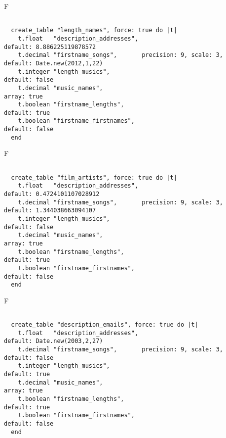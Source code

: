 F
\begin{verbatim}

  create_table "length_names", force: true do |t|
    t.float   "description_addresses",                         default: 8.886225119878572
    t.decimal "firstname_songs",       precision: 9, scale: 3, default: Date.new(2012,1,22)
    t.integer "length_musics",                                 default: false
    t.decimal "music_names",                                                                             array: true
    t.boolean "firstname_lengths",                             default: true
    t.boolean "firstname_firstnames",                          default: false
  end

\end{verbatim}

F
\begin{verbatim}

  create_table "film_artists", force: true do |t|
    t.float   "description_addresses",                         default: 0.4724101107028912
    t.decimal "firstname_songs",       precision: 9, scale: 3, default: 1.344038663094107
    t.integer "length_musics",                                 default: false
    t.decimal "music_names",                                                                             array: true
    t.boolean "firstname_lengths",                             default: true
    t.boolean "firstname_firstnames",                          default: false
  end

\end{verbatim}

F
\begin{verbatim}

  create_table "description_emails", force: true do |t|
    t.float   "description_addresses",                         default: Date.new(2003,2,27)
    t.decimal "firstname_songs",       precision: 9, scale: 3, default: false
    t.integer "length_musics",                                 default: true
    t.decimal "music_names",                                                                             array: true
    t.boolean "firstname_lengths",                             default: true
    t.boolean "firstname_firstnames",                          default: false
  end

\end{verbatim}

